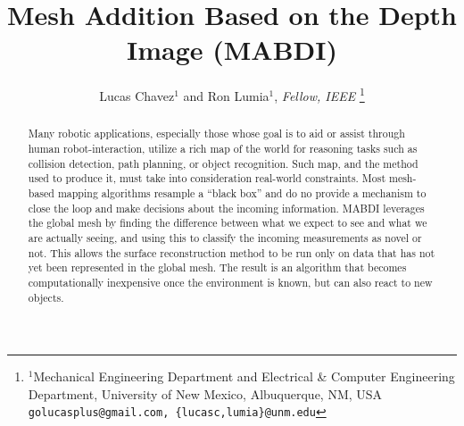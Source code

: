 \documentclass[letterpaper, 10 pt, conference]{ieeeconf}  %
\title{\LARGE \bf
Mesh Addition Based on the Depth Image (MABDI)
}
\author{Lucas Chavez$^{1}$ and Ron Lumia$^{1}$, \textit{Fellow, IEEE}%
\thanks{$^{1}$Mechanical Engineering Department and Electrical \& Computer Engineering Department, University of New Mexico,
	Albuquerque, NM, USA
        {\tt\small golucasplus@gmail.com, \{lucasc,lumia\}@unm.edu}}%
}%
\begin{document}
\maketitle
\thispagestyle{empty}
\pagestyle{empty}


\begin{abstract}


Many robotic applications, especially those whose goal is to aid or assist
through human robot-interaction, utilize a rich map of the world for reasoning
tasks such as collision detection, path planning, or object recognition. Such
map, and the method used to produce it, must take into consideration real-world
constraints. Most mesh-based mapping algorithms resample a ``black box'' and do
no provide a mechanism to close the loop and make decisions about the
incoming information. MABDI leverages the global mesh by finding the difference
between what we expect to see and what we are actually seeing, and using this to
classify the incoming measurements as novel or not. This allows the surface
reconstruction method to be run only on data that has not yet been represented in
the global mesh. The result is an algorithm that becomes computationally
inexpensive once the environment is known, but can also react to new objects.


\end{abstract}














\end{document}
